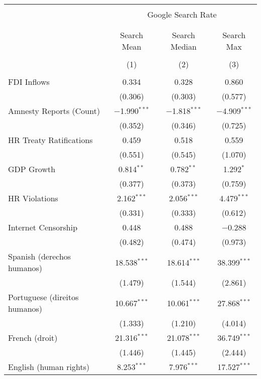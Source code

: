 
\begin{table}[!htbp] \centering 
  \caption{} 
  \label{} 
\begin{tabular}{@{\extracolsep{5pt}}lccc} 
\\[-1.8ex]\hline 
\hline \\[-1.8ex] 
 & \multicolumn{3}{c}{Google Search Rate} \\ 
\cline{2-4} 
\\[-1.8ex] & \multicolumn{3}{c}{ } \\ 
 & Search Mean & Search Median & Search Max \\ 
\\[-1.8ex] & (1) & (2) & (3)\\ 
\hline \\[-1.8ex] 
 FDI Inflows & 0.334 & 0.328 & 0.860 \\ 
  & (0.306) & (0.303) & (0.577) \\ 
  Amnesty Reports (Count) & $-$1.990$^{***}$ & $-$1.818$^{***}$ & $-$4.909$^{***}$ \\ 
  & (0.352) & (0.346) & (0.725) \\ 
  HR Treaty Ratifications & 0.459 & 0.518 & 0.559 \\ 
  & (0.551) & (0.545) & (1.070) \\ 
  GDP Growth & 0.814$^{**}$ & 0.782$^{**}$ & 1.292$^{*}$ \\ 
  & (0.377) & (0.373) & (0.759) \\ 
  HR Violations & 2.162$^{***}$ & 2.056$^{***}$ & 4.479$^{***}$ \\ 
  & (0.331) & (0.333) & (0.612) \\ 
  Internet Censorship & 0.448 & 0.488 & $-$0.288 \\ 
  & (0.482) & (0.474) & (0.973) \\ 
  Spanish (derechos humanos) & 18.538$^{***}$ & 18.614$^{***}$ & 38.399$^{***}$ \\ 
  & (1.479) & (1.544) & (2.861) \\ 
  Portuguese (direitos humanos) & 10.667$^{***}$ & 10.061$^{***}$ & 27.868$^{***}$ \\ 
  & (1.333) & (1.210) & (4.014) \\ 
  French (droit) & 21.316$^{***}$ & 21.078$^{***}$ & 36.749$^{***}$ \\ 
  & (1.446) & (1.445) & (2.444) \\ 
  English (human rights) & 8.253$^{***}$ & 7.976$^{***}$ & 17.527$^{***}$ \\ 

\end{tabular}
\end{table}
